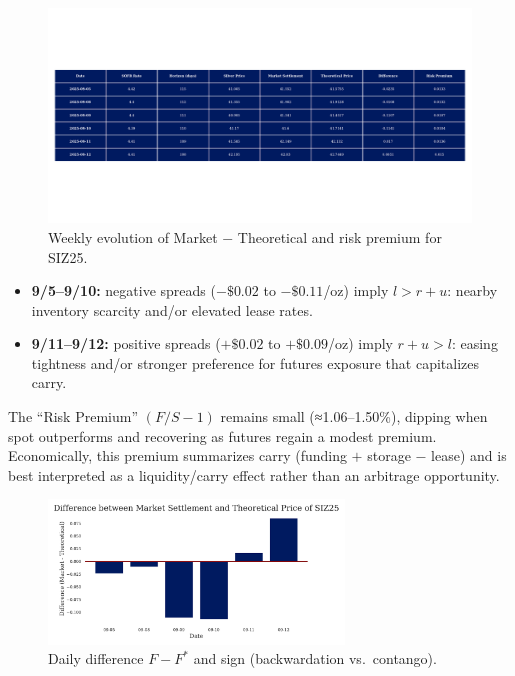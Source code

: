 \documentclass[10pt,a4paper]{article} %
\begin{document}
\begin{figure}[h]
\centering
\includegraphics[width=\textwidth]{figures/silver_pricing_over_the_week.pdf}
\caption{Weekly evolution of Market \(-\) Theoretical and risk premium for SIZ25.}
\label{fig:silver_week}
\end{figure}

\begin{itemize}
  \item \textbf{9/5–9/10:} negative spreads (\(-\$0.02\) to \(-\$0.11\)/oz) imply \(l>r+u\): nearby inventory scarcity and/or elevated lease rates.
  \item \textbf{9/11–9/12:} positive spreads (\(+\$0.02\) to \(+\$0.09\)/oz) imply \(r+u>l\): easing tightness and/or stronger preference for futures exposure that capitalizes carry.
\end{itemize}
The “Risk Premium” \((F/S-1)\) remains small (≈1.06–1.50\%), dipping when spot outperforms and recovering as futures regain a modest premium. Economically, this premium summarizes carry (funding \(+\) storage \(-\) lease) and is best interpreted as a liquidity/carry effect rather than an arbitrage opportunity.

\begin{figure}[h]
\centering
\includegraphics[width=0.7\textwidth]{figures/silver_difference.pdf}
\caption{Daily difference \(F-F^{*}\) and sign (backwardation vs.\ contango).}
\label{fig:silver_difference}
\end{figure}
\end{document}
